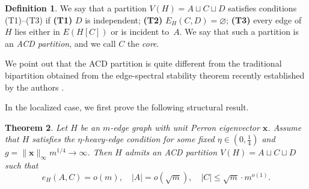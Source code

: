 \documentclass[11pt]{article}
\newtheorem{theorem}{Theorem}[section]
\theoremstyle{definition}
\newtheorem{definition}[theorem]{Definition}
\theoremstyle{plain}
\begin{document}
\begin{definition} \label{def:ACD-partition} 
We say that a partition $V(H)=A\sqcup C\sqcup D$ satisfies conditions (T1)--(T3) if \textbf{(T1)} $D$ is independent;
\textbf{(T2)} $E_H(C,D)=\varnothing$;
\textbf{(T3)} every edge of $H$ lies either in $E(H[C])$ or is incident to~$A$. 
We say that such a partition is an \emph{ACD partition}, and we call \(C\) the \emph{core}. 
\end{definition}

We point out that the ACD partition is quite different from the traditional bipartition obtained from the edge-spectral stability theorem recently established by the authors \cite{LiLiuZhang2025EdgeSpectralESS}. 

In the localized case, we first prove the following structural result. 

\begin{theorem} 
\label{thm:localized-structure}
Let $H$ be an $m$-edge graph with unit Perron eigenvector $\bm{x}$. 
Assume that $H$ satisfies the $\eta$-heavy-edge condition for some fixed $\eta\in(0,\tfrac14)$ and $g=\|\bm{x} \|_\infty m^{1/4} \to\infty$. 
Then $H$ admits an ACD partition $V(H)=A\sqcup C\sqcup D$ such that 
\[
 e_H(A,C)=o(m), \quad 
|A|=o(\sqrt{m}), \quad 
|C| \le \sqrt{m}\cdot m^{o(1)}. 
\] 
\end{theorem}
\end{document}
